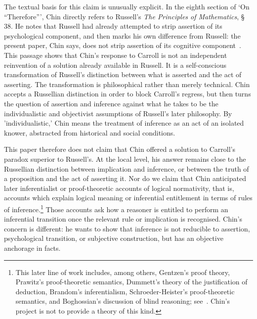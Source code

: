\documentclass{birkjour}
\begin{document}
The textual basis for this claim is unusually explicit. In the eighth section of `On ``Therefore''', Chin directly refers to Russell's \textit{The Principles of Mathematics}, \S\,38. He notes that Russell had already attempted to strip assertion of its psychological component, and then marks his own difference from Russell: the present paper, Chin says, does not strip assertion of its cognitive component~\cite[p.~42]{Liu2018}. This passage shows that Chin's response to Carroll is not an independent reinvention of a solution already available in Russell. It is a self-conscious transformation of Russell's distinction between what is asserted and the act of asserting. The transformation is philosophical rather than merely technical. Chin accepts a Russellian distinction in order to block Carroll's regress, but then turns the question of assertion and inference against what he takes to be the individualistic and objectivist assumptions of Russell's later philosophy. By 'individualistic,' Chin means the treatment of inference as an act of an isolated knower, abstracted from historical and social conditions.

This paper therefore does not claim that Chin offered a solution to Carroll's paradox superior to Russell's. At the local level, his answer remains close to the Russellian distinction between implication and inference, or between the truth of a proposition and the act of asserting it. Nor do we claim that Chin anticipated later inferentialist or proof-theoretic accounts of logical normativity, that is, accounts which explain logical meaning or inferential entitlement in terms of rules of inference.\footnote{This later line of work includes, among others, Gentzen's proof theory, Prawitz's proof-theoretic semantics, Dummett's theory of the justification of deduction, Brandom's inferentialism, Schroeder-Heister's proof-theoretic semantics, and Boghossian's discussion of blind reasoning; see~\cite{Brandom1994,SchroederHeister2012,Boghossian2003}. Chin's project is not to provide a theory of this kind.} Those accounts ask how a reasoner is entitled to perform an inferential transition once the relevant rule or implication is recognised. Chin's concern is different: he wants to show that inference is not reducible to assertion, psychological transition, or subjective construction, but has an objective anchorage in facts.
\end{document}
